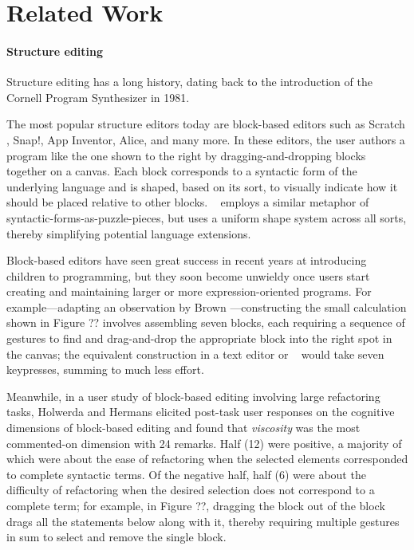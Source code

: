 \section{Related Work}\label{sec:related-work}

\paragraph{Structure editing}
Structure editing has a long history, dating back
to the introduction of the Cornell Program Synthesizer
\cite{Cornell} in 1981.

The most popular structure editors today
are block-based editors such as Scratch \cite{scratch}, Snap!,
App Inventor, Alice, and many more.
In these editors, the user authors a program
like the one shown to the right
by dragging-and-dropping blocks together on a canvas.
Each block corresponds to a syntactic form of
the underlying language and is shaped, based on its
sort, to visually indicate how it should be placed relative
to other blocks.
\tylr~ employs a similar metaphor of syntactic-forms-as-puzzle-pieces,
but uses a uniform shape system across all sorts,
thereby simplifying potential language extensions.

Block-based editors have seen great success in recent years
at introducing children to programming, but they soon
become unwieldy once users start creating and maintaining
larger or more expression-oriented programs.
For example---adapting an observation by
Brown \etal \cite{no-keyboard-cripples}---constructing
the small calculation shown in
Figure ?? involves assembling seven blocks, each
requiring a sequence of gestures to find and
drag-and-drop the appropriate block into the right spot
in the canvas;
the equivalent construction in a text editor or \tylr~ would
take seven keypresses, summing to much less effort.

Meanwhile, in a user study of block-based editing
involving large refactoring tasks,
Holwerda and Hermans elicited post-task user responses
on the cognitive dimensions of block-based editing and
found that \emph{viscosity} was the most commented-on
dimension with 24 remarks.
Half (12) were positive, a majority of which
were about the ease of refactoring when the selected
elements corresponded to complete syntactic terms.
Of the negative half, half (6) were about the difficulty
of refactoring when the desired selection
does not correspond to a complete term;
for example, in Figure ??, dragging the  block out of
the  block drags all the statements below
along with it, thereby requiring multiple gestures
in sum to select and remove the single  block.

